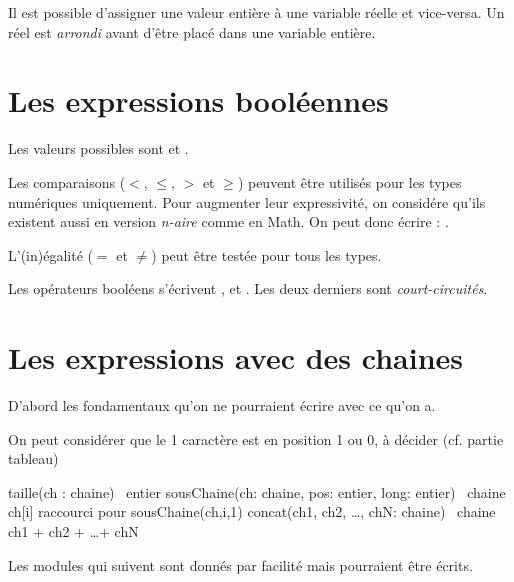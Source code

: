 	Il est possible d'assigner une valeur entière à une variable réelle
	et vice-versa. Un réel est \emph{arrondi} avant d'être placé
	dans une variable entière.

\section{Les expressions booléennes}

	Les valeurs possibles sont  et .
	
	Les comparaisons ($<$, $\leq$, $>$ et $\geq$) peuvent être utilisés
	pour les types numériques uniquement.
	Pour augmenter leur expressivité, on considére qu'ils
	existent aussi en version \emph{n-aire} comme en Math.
	On peut donc écrire : .
	
	L'(in)égalité ($=$ et $\neq$) peut être testée pour tous les types.
	
	Les opérateurs booléens s'écrivent 
	,  et .
	Les deux derniers sont \emph{court-circuités}.

\section{Les expressions avec des chaines}

	D'abord les fondamentaux qu'on ne pourraient écrire avec ce qu'on a.
	
	\begin{Note}
		On peut considérer que le 1\ier{} caractère est en position 1 ou 0,
		à décider (cf. partie tableau)
	\end{Note} 

	\begin{Pseudocode}
		\Stmt taille(ch : chaine) \Gives~entier			
		\Stmt sousChaine(ch: chaine, pos: entier, long: entier) \Gives~chaine 
		\Stmt ch[i]											\RComment raccourci pour sousChaine(ch,i,1)
		\Stmt concat(ch1, ch2, \dots, chN: chaine) \Gives~chaine 	
		\Let  ch1 + ch2 + \dots + chN						
	\end{Pseudocode}
	
	Les modules qui suivent sont donnés par facilité
	mais pourraient être écrits.

